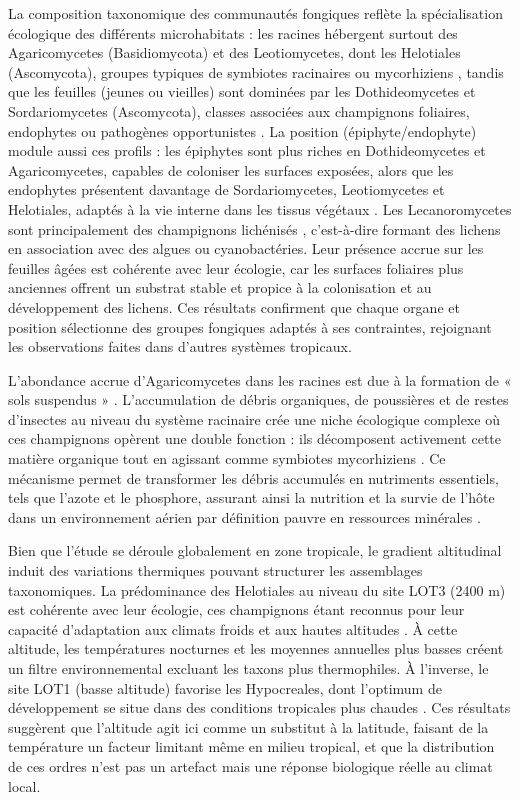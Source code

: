 \documentclass[a4paper,12pt]{article}
\begin{document}
La composition taxonomique des communautés fongiques reflète la spécialisation écologique des différents microhabitats : les racines hébergent surtout des Agaricomycetes (Basidiomycota) et des Leotiomycetes, dont les Helotiales (Ascomycota), groupes typiques de symbiotes racinaires ou mycorhiziens \citep{vraalstad2002molecular}, tandis que les feuilles (jeunes ou vieilles) sont dominées par les Dothideomycetes et Sordariomycetes (Ascomycota), classes associées aux champignons foliaires, endophytes ou pathogènes opportunistes \citep{arnold_are_2000,tedersoo2014global}. La position (épiphyte/endophyte) module aussi ces profils : les épiphytes sont plus riches en Dothideomycetes et Agaricomycetes, capables de coloniser les surfaces exposées, alors que les endophytes présentent davantage de Sordariomycetes, Leotiomycetes et Helotiales, adaptés à la vie interne dans les tissus végétaux \citep{vorholt2012microbial}. 
Les Lecanoromycetes sont principalement des champignons lichénisés \citep{miadlikowska2006new}, c’est-à-dire formant des lichens en association avec des algues ou cyanobactéries. Leur présence accrue sur les feuilles âgées est cohérente avec leur écologie, car les surfaces foliaires plus anciennes offrent un substrat stable et propice à la colonisation et au développement des lichens.
Ces résultats confirment que chaque organe et position sélectionne des groupes fongiques adaptés à ses contraintes, rejoignant les observations faites dans d’autres systèmes
tropicaux.

L'abondance accrue d'Agaricomycetes dans les racines est due à la formation de « sols suspendus » \citep{nadkarni1981}. L’accumulation de débris organiques, de poussières et de restes d'insectes au niveau du système racinaire crée une niche écologique complexe où ces champignons opèrent une double fonction : ils décomposent activement cette matière organique tout en agissant comme symbiotes mycorhiziens \citep{martinson2010}. Ce mécanisme permet de transformer les débris accumulés en nutriments essentiels, tels que l'azote et le phosphore, assurant ainsi la nutrition et la survie de l'hôte dans un environnement aérien par définition pauvre en ressources minérales \citep{dearnaley2007, zotz_plants_2016}.

Bien que l'étude se déroule globalement en zone tropicale, le gradient altitudinal induit des variations thermiques pouvant structurer les assemblages taxonomiques. La prédominance des Helotiales au niveau du site LOT3 (2400 m) est cohérente avec leur écologie, ces champignons étant reconnus pour leur capacité d'adaptation aux climats froids et aux hautes altitudes \citep{Wang_psyc}. À cette altitude, les températures nocturnes et les moyennes annuelles plus basses créent un filtre environnemental excluant les taxons plus thermophiles. À l'inverse, le site LOT1 (basse altitude) favorise les Hypocreales, dont l'optimum de développement se situe dans des conditions tropicales plus chaudes \citep{Tkaczuk_colony}. Ces résultats suggèrent que l'altitude agit ici comme un substitut à la latitude, faisant de la température un facteur limitant même en milieu tropical, et que la distribution de ces ordres n'est pas un artefact mais une réponse biologique réelle au climat local.
\end{document}
